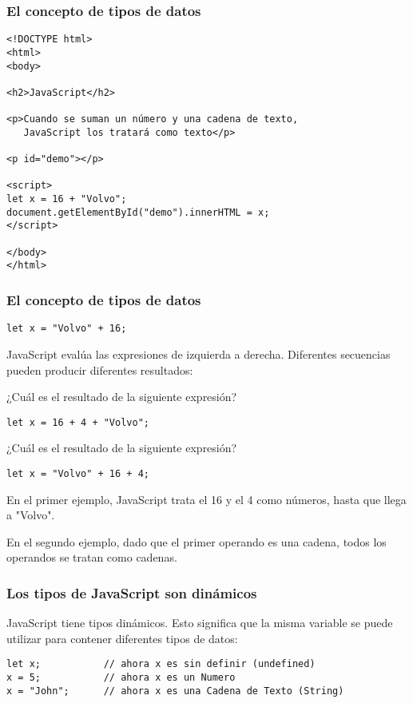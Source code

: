 \begin{frame}[fragile]
  \frametitle{El concepto de tipos de datos}
  \begin{lstlisting}
<!DOCTYPE html>
<html>
<body>

<h2>JavaScript</h2>

<p>Cuando se suman un número y una cadena de texto,
   JavaScript los tratará como texto</p>

<p id="demo"></p>

<script>
let x = 16 + "Volvo";
document.getElementById("demo").innerHTML = x;
</script>

</body>
</html>
  \end{lstlisting}
\end{frame}

\begin{frame}[fragile]
  \frametitle{El concepto de tipos de datos}

  \begin{lstlisting}
let x = "Volvo" + 16;
  \end{lstlisting}

  \vspace{\baselineskip}
  JavaScript evalúa las expresiones de izquierda a derecha.
  Diferentes secuencias pueden producir diferentes resultados:

  \vspace{\baselineskip}
¿Cuál es el resultado de la siguiente expresión?
  \begin{lstlisting}
let x = 16 + 4 + "Volvo";
  \end{lstlisting}

  \vspace{\baselineskip}
¿Cuál es el resultado de la siguiente expresión?
  \begin{lstlisting}
let x = "Volvo" + 16 + 4;
  \end{lstlisting}

  En el primer ejemplo, JavaScript trata el 16 y el 4 como números,
  hasta que llega a "Volvo".

  \vspace{\baselineskip}
  En el segundo ejemplo, dado que el primer operando es una cadena,
  todos los operandos se tratan como cadenas.
\end{frame}

\begin{frame}[fragile]
  \frametitle{Los tipos de JavaScript son dinámicos}

  JavaScript tiene tipos dinámicos. Esto significa que la misma
  variable se puede utilizar para contener diferentes tipos de datos:

  \vspace{\baselineskip}
  \begin{lstlisting}
let x;           // ahora x es sin definir (undefined)
x = 5;           // ahora x es un Numero
x = "John";      // ahora x es una Cadena de Texto (String)
  \end{lstlisting}
\end{frame}


